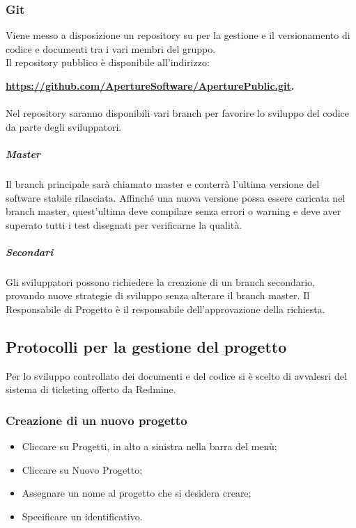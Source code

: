 \subsubsection{Git}
\label{4.3}
Viene messo a disposizione un repository  su  per la gestione e il versionamento di codice e documenti tra i vari membri del gruppo.\\
Il repository pubblico è disponibile all'indirizzo: \\
\begin{center}
\textbf{\url{https://github.com/ApertureSoftware/AperturePublic.git}.}
\end{center}

\paragraph{}
\label{4.4}
Nel repository saranno disponibili vari branch per favorire lo sviluppo del codice da parte degli sviluppatori.

\subparagraph{Master}
\label{4.4.1}
Il branch principale sarà chiamato master e conterrà l'ultima versione del software stabile rilasciata. Affinché una nuova versione possa essere caricata nel branch master, quest'ultima deve compilare senza errori o warning e deve aver superato tutti i test disegnati per verificarne la qualità.

\subparagraph{Secondari}
\label{4.4.2}
Gli sviluppatori possono richiedere la creazione di un branch secondario, provando nuove strategie di sviluppo senza alterare il branch master. Il Responsabile di Progetto è il responsabile dell'approvazione della richiesta.



\subsection{Protocolli per la gestione del progetto}

Per lo sviluppo controllato dei documenti e del codice si è scelto di avvalesri del sistema di ticketing offerto da Redmine.
\subsubsection{Creazione di un nuovo progetto}
\begin{itemize}
\item Cliccare su Progetti, in alto a sinistra nella barra del menù;
\item Cliccare su Nuovo Progetto;
\item Assegnare un nome al progetto che si desidera creare;
\item Specificare un identificativo.
\end{itemize}

